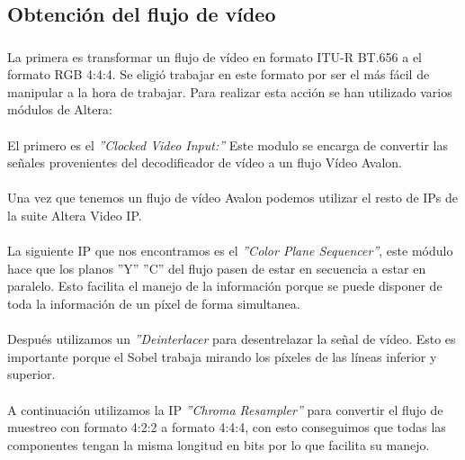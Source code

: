 \documentclass[a4paper,12pt,titlepage,final]{book}
\begin{document}
\subsection{Obtención del flujo de vídeo}
\subsubsection*{}

\paragraph{}
La primera es transformar un flujo de vídeo en formato ITU-R BT.656 a el formato RGB 4:4:4. Se eligió trabajar en este formato por ser el más fácil de manipular a la hora de trabajar. Para realizar esta acción se han utilizado varios módulos de Altera:

\paragraph{}
El primero es el \textit{''Clocked Video Input:''} Este modulo se encarga de convertir las señales provenientes del decodificador de vídeo a un flujo Vídeo Avalon.

\paragraph{}
Una vez que tenemos un flujo de vídeo Avalon podemos utilizar el resto de IPs de la suite Altera Video IP.

\paragraph{}
La siguiente IP que nos encontramos es el \textit{''Color Plane Sequencer''}, este módulo hace que los planos ''Y'' ''C'' del flujo pasen de estar en secuencia a estar en paralelo. Esto facilita el manejo de la información porque se puede disponer de toda la información de un píxel de forma simultanea.

\paragraph{}
Después utilizamos un \textit{''Deinterlacer} para desentrelazar la señal de vídeo. Esto es importante porque el Sobel trabaja mirando los píxeles de las líneas inferior y superior.

\paragraph{}
A continuación utilizamos la IP \textit{''Chroma Resampler''} para convertir el flujo de muestreo con formato 4:2:2 a formato 4:4:4, con esto conseguimos que todas las componentes tengan la misma longitud en bits por lo que facilita su manejo.
\end{document}

